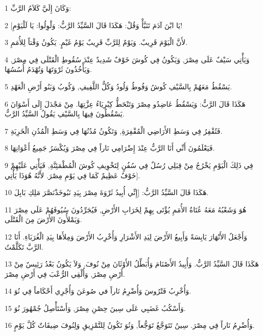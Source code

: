 \par 1 وَكَانَ إِلَيَّ كَلاَمُ الرَّبِّ:
\par 2 [يَا ابْنَ آدَمَ تَنَبَّأْ وَقُلْ: هَكَذَا قَالَ السَّيِّدُ الرَّبُّ: وَلْوِلُوا: يَا لَلْيَوْمِ!
\par 3 لأَنَّ الْيَوْمَ قَرِيبٌ. وَيَوْمٌ لِلرَّبِّ قَرِيبٌ يَوْمُ غَيْمٍ. يَكُونُ وَقْتاً لِلأُمَمِ.
\par 4 وَيَأْتِي سَيْفٌ عَلَى مِصْرَ, وَيَكُونُ فِي كُوشَ خَوْفٌ شَدِيدٌ عِنْدَ سُقُوطِ الْقَتْلَى فِي مِصْرَ, وَيَأْخُذُونَ ثَرْوَتَهَا وَتُهْدَمُ أُسُسُهَا.
\par 5 يَسْقُطُ مَعَهُمْ بِالسَّيْفِ كُوشُ وَفُوطُ وَلُودُ وَكُلُّ اللَّفِيفِ, وَكُوبُ وَبَنُو أَرْضِ الْعَهْدِ.
\par 6 هَكَذَا قَالَ الرَّبُّ: وَيَسْقُطُ عَاضِدُو مِصْرَ وَتَنْحَطُّ كِبْرِيَاءُ عِزَّتِهَا. مِنْ مَجْدَلَ إِلَى أَسْوَانَ يَسْقُطُونَ فِيهَا بِالسَّيْفِ يَقُولُ السَّيِّدُ الرَّبُّ.
\par 7 فَتُقْفِرُ فِي وَسَطِ الأَرَاضِي الْمُقْفِرَةِ, وَتَكُونُ مُدُنُهَا فِي وَسَطِ الْمُدُنِ الْخَرِبَةِ.
\par 8 فَيَعْلَمُونَ أَنِّي أَنَا الرَّبُّ عِنْدَ إِضْرَامِي نَاراً فِي مِصْرَ وَيُكْسَرُ جَمِيعُ أَعْوَانِهَا.
\par 9 فِي ذَلِكَ الْيَوْمِ يَخْرُجُ مِنْ قِبَلِي رُسُلٌ فِي سُفُنٍ لِتَخْوِيفِ كُوشَ الْمُطْمَئِنَّةِ, فَيَأْتِي عَلَيْهِمْ خَوْفٌ عَظِيمٌ كَمَا فِي يَوْمِ مِصْرَ. لأَنَّهُ هُوَذَا يَأْتِي].
\par 10 هَكَذَا قَالَ السَّيِّدُ الرَّبُّ: [إِنِّي أُبِيدُ ثَرْوَةَ مِصْرَ بِيَدِ نَبُوخَذْنَصَّرَ مَلِكِ بَابِلَ.
\par 11 هُوَ وَشَعْبُهُ مَعَهُ عُتَاةُ الأُمَمِ يُؤْتَى بِهِمْ لِخَرَابِ الأَرْضِ, فَيُجَرِّدُونَ سُيُوفَهُمْ عَلَى مِصْرَ وَيَمْلأُونَ الأَرْضَ مِنَ الْقَتْلَى.
\par 12 وَأَجْعَلُ الأَنْهَارَ يَابِسَةً وَأَبِيعُ الأَرْضَ لِيَدِ الأَشْرَارِ وَأُخْرِبُ الأَرْضَ وَمِلأَهَا بِيَدِ الْغُرَبَاءِ. أَنَا الرَّبَّ تَكَلَّمْتُ.
\par 13 هَكَذَا قَالَ السَّيِّدُ الرَّبُّ. وَأُبِيدُ الأَصْنَامَ وَأُبَطِّلُ الأَوْثَانَ مِنْ نُوفَ. وَلاَ يَكُونُ بَعْدُ رَئِيسٌ مِنْ أَرْضِ مِصْرَ, وَأُلْقِي الرُّعْبَ فِي أَرْضِ مِصْرَ.
\par 14 وَأُخْرِبُ فَتْرُوسَ وَأُضْرِمُ نَاراً في صُوعَنَ وَأُجْرِي أَحْكَاماً فِي نُوَ.
\par 15 وَأَسْكُبُ غَضَبِي عَلَى سِينَ حِصْنِ مِصْرَ, وَأَسْتَأْصِلُ جُمْهُورَ نُوَ.
\par 16 وَأُضْرِمُ نَاراً فِي مِصْرَ. سِينُ تَتَوَجَّعُ تَوَجُّعاً, وَنُوَ تَكُونُ لِلتَّمْزِيقِ وَلِنُوفَ ضِيقَاتٌ كُلَّ يَوْمٍ.

